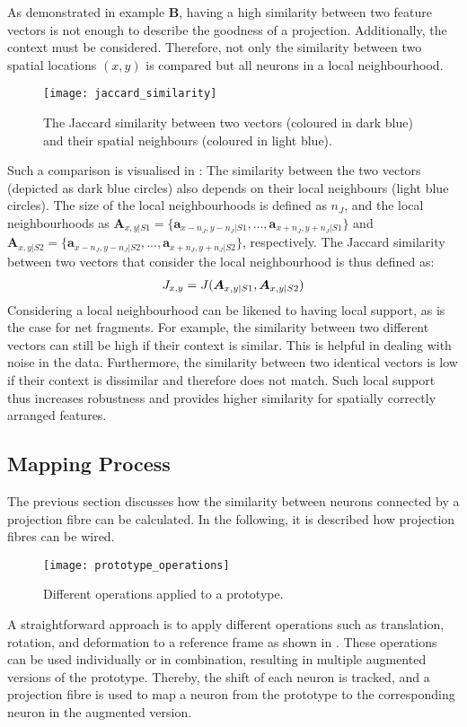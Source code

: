 As demonstrated in  example $\boldsymbol{B}$, having a high similarity between two feature vectors is not enough to describe the goodness of a projection.
Additionally, the context must be considered.
Therefore, not only the similarity between two spatial locations $(x,y)$ is compared but all neurons in a local neighbourhood.
\begin{figure}[h]
    \centering
    \texttt{[image: jaccard\_similarity]}
    \caption[Similarity between two vectors and their spatial neighbours]{The Jaccard similarity between two vectors (coloured in dark blue) and their spatial neighbours (coloured in light blue).}
\end{figure}
Such a comparison is visualised in :
The similarity between the two vectors (depicted as dark blue circles) also depends on their local neighbours (light blue circles).
The size of the local neighbourhoods is defined as $n_J$, and the local neighbourhoods as $\boldsymbol{A}_{x,y|S1} = \{ \boldsymbol{a}_{x-n_J,y-n_J|S1}, ..., \boldsymbol{a}_{x+n_J,y+n_J|S1}\}$ and $\boldsymbol{A}_{x,y|S2} = \{ \boldsymbol{a}_{x-n_J,y-n_J|S2}, ..., \boldsymbol{a}_{x+n_J,y+n_J|S2}\}$, respectively.
The Jaccard similarity between two vectors that consider the local neighbourhood is thus defined as:
%
\begin{align}\eqlbl{jaccard2}
	J_{x,y} = J(\boldsymbol{A}_{x,y|S1}, \boldsymbol{A}_{x,y|S2})
\end{align}
%
Considering a local neighbourhood can be likened to having local support, as is the case for net fragments. For example, the similarity between two different vectors can still be high if their context is similar. This is helpful in dealing with noise in the data.
Furthermore, the similarity between two identical vectors is low if their context is dissimilar and therefore does not match.
Such local support thus increases robustness and provides higher similarity for spatially correctly arranged features.


\subsection{Mapping Process}
The previous section discusses how the similarity between neurons connected by a projection fibre can be calculated.
In the following, it is described how projection fibres can be wired.

\begin{figure}[h]
    \centering
    \texttt{[image: prototype\_operations]}
    \caption[Operations applied to a prototype]{Different operations applied to a prototype.}
\end{figure}
A straightforward approach is to apply different operations such as translation, rotation, and deformation to a reference frame as shown in . These operations can be used individually or in combination, resulting in multiple augmented versions of the prototype.
Thereby, the shift of each neuron is tracked, and a projection fibre is used to map a neuron from the prototype to the corresponding neuron in the augmented version.

